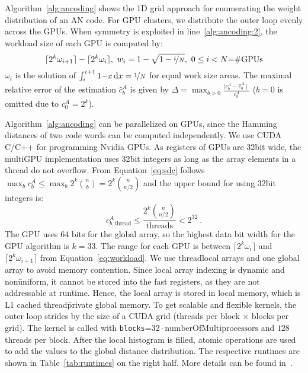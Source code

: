 Algorithm~\ref{alg:ancoding} shows the 1D grid approach for enumerating the weight distribution of an AN code. For GPU clusters, we distribute the outer loop evenly across the GPUs. When symmetry is exploited in line~\ref{alg:ancoding:2}, the workload size of each GPU is computed by:
\begin{equation}
	\lceil 2^k\omega_{i+1} \rceil - \lceil 2^k\omega_{i} \rceil,~w_i=1-\sqrt{1-\nicefrac{i}{N}},~0\le i<N \mbox{=\#GPUs}
	\label{eq:workload}
\end{equation}
$\omega_i$ is the solution of $\int_{i}^{i+1}1{-}x\,\mathrm{d}x=\nicefrac{1}{N}$ for equal work size areas. The maximal relative error of the estimation $\hat{c}^A_b$ is given by $\Delta = \max_{b>0} \frac{\mid c^A_b - \hat{c}^A_b \mid}{c^A_b}$ ($b=0$ is omitted due to $c^A_0=2^k$).

Algorithm~\ref{alg:ancoding} can be parallelized on GPUs, since the Hamming distances of two code
 words can be computed independently. We use CUDA C/C++ for programming Nvidia GPUs. As registers of GPUs are 32\=bit wide, the multi\=GPU implementation uses 32\=bit integers as long as the array elements in a thread do not overflow. From Equation~\ref{eq:sdc} follows $\max_b c_b^A\le\max_b 2^k\binom{n}{b}=2^k\binom{n}{n/2}$ and the upper bound for using 32\=bit integers is:
\[
c^A_{b,\mathrm{thread}}\le\frac{2^k\binom{n}{n/2}}{\mathrm{threads}}<2^{32}~.
\]
The GPU uses 64 bits for the global array, so the highest data bit width for the GPU algorithm is $k=33$. The range for each GPU is between $\lceil 2^k\omega_{i} \rceil$ and $\lceil 2^k\omega_{i+1} \rceil$ from Equation~\ref{eq:workload}. We use thread\=local arrays and one global array to avoid memory contention. Since local array indexing is dynamic and non\=uniform, it cannot be stored into the fast registers, as they are not addressable at run\=time. Hence, the local array is stored in local memory, which is L1 cached thread\=private global memory. To get scalable and flexible kernels, the outer loop strides by the size of a CUDA grid (threads per block $\times$ blocks per grid). The kernel is called with \lstinline{blocks}=$32\cdot\mathrm{numberOfMultiprocessors}$ and $128$ threads per block. After the local histogram is filled, atomic operations are used to add the values to the global distance distribution. The respective runtimes are shown in Table~\ref{tab:runtimes} on the right half. More details can be found in~\cite{kolditz2018}.



